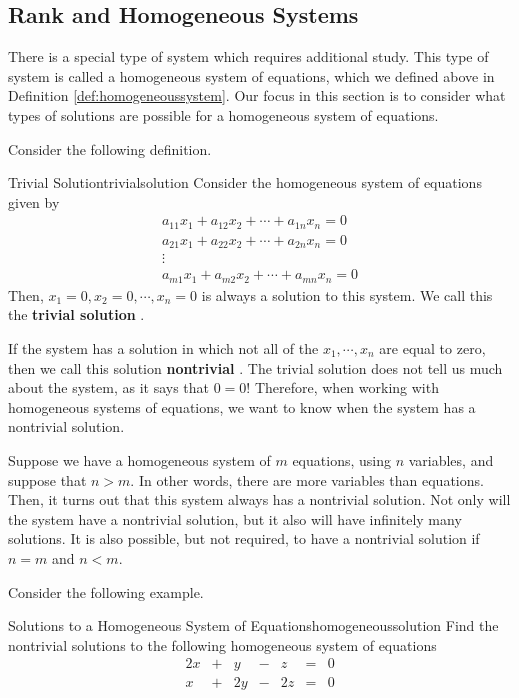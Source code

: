 \subsection{Rank and Homogeneous Systems}

There is a special type of system which requires additional study. This type of system is called a homogeneous system of
equations, which we defined above in Definition \ref{def:homogeneoussystem}. 
Our focus in this section is to consider what types of solutions are possible for a homogeneous system of equations. 

Consider the following definition. 

\begin{definition}{Trivial Solution}{trivialsolution}
Consider the homogeneous system of equations given by
\begin{equation*}
\begin{array}{c}
a_{11}x_{1}+a_{12}x_{2}+\cdots +a_{1n}x_{n}= 0 \\
a_{21}x_{1}+a_{22}x_{2}+\cdots +a_{2n}x_{n}= 0  \\
\vdots \\
a_{m1}x_{1}+a_{m2}x_{2}+\cdots +a_{mn}x_{n}= 0 
\end{array}
\end{equation*}
Then, $x_{1} = 0, x_{2} = 0, \cdots, x_{n} =0$ is always a 
solution to this system. We call this the \textbf{trivial solution} .
\end{definition}

If the system has a solution in which not all of the $x_1, \cdots, x_n$ are equal to zero,
then we call this solution \textbf{nontrivial} . The trivial solution
does not tell us much about the system, as it says that $0=0$! 
Therefore, when working with homogeneous systems of 
equations, we want to know when the system has a nontrivial solution. 

Suppose we have a homogeneous system of $m$ equations, using $n$ variables, and suppose that
$n > m$. In other words, there are more variables than equations. 
Then, it turns out that this system always has a nontrivial solution. Not only will the
system have a nontrivial solution, but it also will have infinitely many solutions.
It is also possible, but not required, to have a nontrivial solution if $n=m$ and $n<m$.

Consider the following example.

\begin{example}{Solutions to a Homogeneous System of Equations}{homogeneoussolution}
Find the nontrivial solutions to the following homogeneous system of equations
\begin{equation*}
\begin{array}{cccccccc}
2x &+& y &-& z &=& 0 \\
x &+& 2y &-& 2z &=& 0
\end{array}
\end{equation*}
\end{example}


